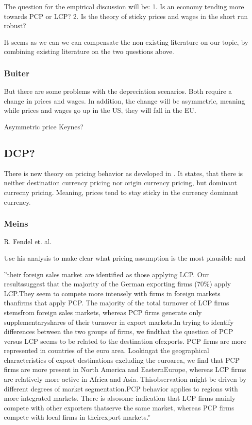 The question for the empirical discussion will be: 
1. Is an economy tending more towards PCP or LCP?
2. Is the theory of sticky prices and wages in the short run robust?

It seems as we can we can compensate the non existing literature on our topic, by combining existing literature on the two questions above. 
\subsubsection{Buiter}

But there are some problems with the depreciation scenarios. Both require a change in prices and wages. In addition, the change will be asymmetric, meaning while prices and wages go up in the US, they will fall in the EU.

Asymmetric price Keynes?

\subsection{DCP?}
There is new theory on pricing behavior as developed in \cite{casas2017dominant}. It states, that there is neither destination currency pricing nor origin currency pricing, but dominant currecny pricing. Meaning, prices tend to stay sticky in the currency dominant currency.  


\subsubsection{Meins}
R. Fendel et. al.

Use his analysis to make clear what pricing assumption is the most plausible and 

''their foreign sales market are identified as those applying LCP. Our resultssuggest that the majority of the German exporting firms (70\%) apply LCP.They seem to compete more intensely with firms in foreign markets thanfirms that apply PCP. The majority of the total turnover of LCP firms stemsfrom foreign sales markets, whereas PCP firms generate only supplementaryshares of their turnover in export markets.In trying to identify differences between the two groups of firms, we findthat the question of PCP versus LCP seems to be related to the destination ofexports. PCP firms are more represented in countries of the euro area. Lookingat the geographical characteristics of export destinations excluding the euroarea, we find that PCP firms are more present in North America and EasternEurope, whereas LCP firms are relatively more active in Africa and Asia. Thisobservation might be driven by different degrees of market segmentation.PCP behavior applies to regions with more integrated markets. There is alsosome indication that LCP firms mainly compete with other exporters thatserve the same market, whereas PCP firms compete with local firms in theirexport markets.''
